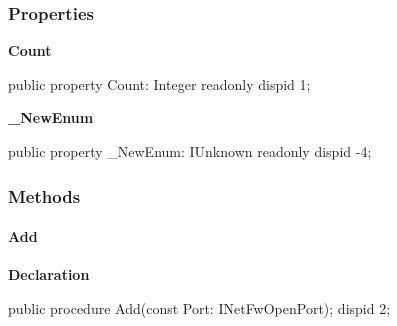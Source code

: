 \documentclass{report}
\newif\ifpdf
\begin{document}
\subsubsection*{\large{\textbf{Properties}}\normalsize\hspace{1ex}\hfill}
\begin{list}{}{
\setlength{\itemindent}{0cm}
\setlength{\listparindent}{0cm}
\setlength{\leftmargin}{\evensidemargin}
\addtolength{\leftmargin}{\tmplength}
\settowidth{\labelsep}{X}
\addtolength{\leftmargin}{\labelsep}
\setlength{\labelwidth}{\tmplength}
}
\label{ok_dispid_method.INetFwOpenPortsDisp-Count}
\item[\textbf{Count}\hfill]
\ifpdf
\begin{flushleft}
\fi
\begin{ttfamily}
public property Count: Integer readonly dispid 1;\end{ttfamily}

\ifpdf
\end{flushleft}
\fi


\par  \label{ok_dispid_method.INetFwOpenPortsDisp-_NewEnum}
\item[\textbf{{\_}NewEnum}\hfill]
\ifpdf
\begin{flushleft}
\fi
\begin{ttfamily}
public property {\_}NewEnum: IUnknown readonly dispid -4;\end{ttfamily}

\ifpdf
\end{flushleft}
\fi


\par  \end{list}
\subsubsection*{\large{\textbf{Methods}}\normalsize\hspace{1ex}\hfill}
\paragraph*{Add}\hspace*{\fill}

\label{ok_dispid_method.INetFwOpenPortsDisp-Add}
\begin{list}{}{
\setlength{\itemindent}{0cm}
\setlength{\listparindent}{0cm}
\setlength{\leftmargin}{\evensidemargin}
\addtolength{\leftmargin}{\tmplength}
\settowidth{\labelsep}{X}
\addtolength{\leftmargin}{\labelsep}
\setlength{\labelwidth}{\tmplength}
}
\item[\textbf{Declaration}\hfill]
\ifpdf
\begin{flushleft}
\fi
\begin{ttfamily}
public procedure Add(const Port: INetFwOpenPort); dispid 2; \end{ttfamily}

\ifpdf
\end{flushleft}
\fi

\end{list}
\end{document}
